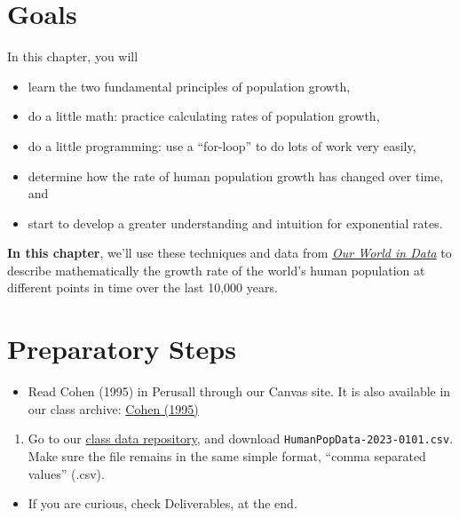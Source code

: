 \documentclass[
  letterpaper,
  DIV=11,
  numbers=noendperiod]{scrreprt}
\providecommand{\tightlist}{%
  \setlength{\itemsep}{0pt}\setlength{\parskip}{0pt}}
\begin{document}
\section{Goals}\label{goals-4}

In this chapter, you will

\begin{itemize}
\tightlist
\item
  learn the two fundamental principles of population growth,
\item
  do a little math: practice calculating rates of population growth,
\item
  do a little programming: use a ``for-loop'' to do lots of work very
  easily,
\item
  determine how the rate of human population growth has changed over
  time, and
\item
  start to develop a greater understanding and intuition for exponential
  rates.
\end{itemize}

\textbf{In this chapter}, we'll use these techniques and data from
\href{http://ourworldindata.org}{\emph{Our World in Data}} to describe
mathematically the growth rate of the world's human population at
different points in time over the last 10,000 years.

\section{Preparatory Steps}\label{preparatory-steps-1}

\begin{itemize}
\tightlist
\item
  Read Cohen (1995) in Perusall through our Canvas site. It is also
  available in our class archive:
  \href{https://drive.google.com/drive/folders/1opLlrmF7kfo0FtWwwJ1CbfPWIyuaISC1?usp=sharing}{Cohen
  (1995)}
\end{itemize}

\begin{enumerate}
\def\labelenumi{\arabic{enumi}.}
\tightlist
\item
  Go to our
  \href{https://drive.google.com/drive/u/1/folders/1FR2FLiW3xyD4Er52YzVTToPZuXXReGRo}{class
  data repository}, and download \texttt{HumanPopData-2023-0101.csv}.
  Make sure the file remains in the same simple format, ``comma
  separated values'' (.csv).
\end{enumerate}

\begin{itemize}
\tightlist
\item
  If you are curious, check Deliverables, at the end.
\end{itemize}
\end{document}
